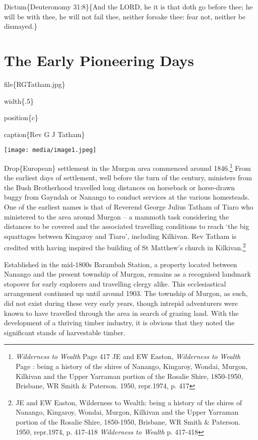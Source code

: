 Dictum\{Deuteronomy 31:8\}\{And the LORD, he it is that doth go before thee; he will be with thee, he will not fail thee, neither forsake thee: fear not, neither be dismayed.\}

\hypertarget{the-early-pioneering-days}{%
\chapter{The Early Pioneering Days}\label{the-early-pioneering-days}}

file\{RGTatham.jpg\}

width\{.5\}

position\{c\}

caption\{Rev G J Tatham\}

\texttt{[image: media/image1.jpeg]}

Drop\{European\} settlement in the Murgon area commenced around 1846.\footnote{\emph{Wilderness to Wealth} Page 417 JE and EW Easton, \emph{Wilderness to Wealth} Page : being a history of the shires of Nanango, Kingaroy, Wondai, Murgon, Kilkivan and the Upper Yarraman portion of the Rosalie Shire, 1850-1950, Brisbane, WR Smith \& Paterson. 1950, repr.1974, p. 417} From the earliest days of settlement, well before the turn of the century, ministers from the Bush Brotherhood travelled long distances on horseback or horse-drawn buggy from Gayndah or Nanango to conduct services at the various homesteads. One of the earliest names is that of Reverend George Julius Tatham of Tiaro who ministered to the area around Murgon -- a mammoth task considering the distances to be covered and the associated travelling conditions to reach `the big squattages between Kingaroy and Tiaro'\emph{,} including Kilkivan. Rev Tatham is credited with having inspired the building of St Matthew's church in Kilkivan.\footnote{JE and EW Easton, Wilderness to Wealth: being a history of the shires of Nanango, Kingaroy, Wondai, Murgon, Kilkivan and the Upper Yarraman portion of the Rosalie Shire, 1850-1950, Brisbane, WR Smith \& Paterson. 1950, repr.1974, p. 417-418 \emph{Wilderness to Wealth} p. 417-418}

Established in the mid-1800s Barambah Station\emph{,} a property located between Nanango and the present township of Murgon, remains as a recognised landmark stopover for early explorers and travelling clergy alike. This ecclesiastical arrangement continued up until around 1903. The township of Murgon, as such, did not exist during these very early years, though intrepid adventurers were known to have travelled through the area in search of grazing land. With the development of a thriving timber industry, it is obvious that they noted the significant stands of harvestable timber.

